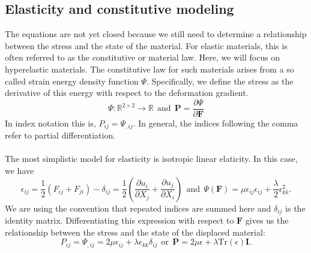 \documentclass[article]{pcms-l}
\begin{document}
\subsection*{Elasticity and constitutive modeling}
The equations are not yet closed because we still need to determine a relationship between the stress and the state of the material. For elastic materials, this is often referred to as the constitutive or material law. Here, we will focus on hyperelastic materials. The constitutive law for such materials arises from a so called strain energy density function $\Psi$. Specifically, we define the stress as the derivative of this energy with respect to the deformation gradient.
$$
\Psi:\mathbb{R}^{2\times2}\rightarrow\mathbb{R} \ \ \textrm{and} \ \ \mathbf{P}=\frac{\partial\Psi}{\partial\mathbf{F}}
$$
In index notation this is, $P_{ij}=\Psi_{,ij}$. In general, the indices following the comma refer to partial differentiation.\\
\\
The most simplistic model for elasticity is isotropic linear elaticity. In this case, we have
$$
\epsilon_{ij}=\frac{1}{2}(F_{ij}+F_{ji})-\delta_{ij}=\frac{1}{2}(\frac{\partial{u}_i}{\partial{X}_j}+\frac{\partial{u}_j}{\partial{X}_i}) \ \ \textrm{and} \ \ \Psi(\mathbf{F})=\mu\epsilon_{ij}\epsilon_{ij}+\frac{\lambda}{2}\epsilon_{kk}^2.
$$
We are using the convention that repeated indices are summed here and $\delta_{ij}$ is the identity matrix. Differentiating this expression with respect to $\mathbf{F}$ gives us the relationship between the stress and the state of the displaced material:
$$
P_{ij}=\Psi_{,ij}=2\mu\epsilon_{ij}+\lambda\epsilon_{kk}\delta_{ij} \ \ \textrm{or} \ \ \mathbf{P}=2\mu\epsilon+\lambda\textrm{Tr}(\epsilon)\mathbf{I}.
$$
\end{document}
